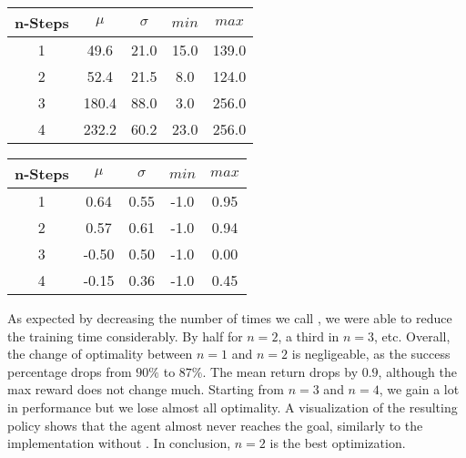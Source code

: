 \begin{table}[h!]
        \centering
        \begin{minipage}{.5\textwidth}
    \begin{tabular}[width=1\linewidth]{||c c c c c||} 
     \hline
     n-Steps & $\mu$ & $\sigma$ & $min$ & $max$ \\  [0.5ex] 
     \hline\hline
     1 & 49.6 & 21.0 & 15.0 & 139.0 \\ 
     \hline
     2 & 52.4 & 21.5 & 8.0 & 124.0 \\
     \hline
     3 & 180.4 & 88.0 & 3.0 & 256.0 \\
     \hline
     4 & 232.2 & 60.2 & 23.0 & 256.0 \\ [1ex] 
     \hline
    \end{tabular}
\end{minipage}%
\begin{minipage}{.5\textwidth}
    \centering
    \begin{tabular}[width=1\linewidth]{||c c c c c||} 
     \hline
     n-Steps & $\mu$ & $\sigma$ & $min$ & $max$ \\  [0.5ex] 
     \hline\hline
     1 & 0.64 & 0.55 & -1.0 & 0.95 \\ 
     \hline
     2 & 0.57 & 0.61 & -1.0 & 0.94 \\
     \hline
     3 & -0.50 & 0.50 & -1.0 & 0.00 \\
     \hline
     4 & -0.15 & 0.36 & -1.0 & 0.45 \\ [1ex] 
     \hline
    \end{tabular}
\end{minipage}%
\end{table}

As expected by decreasing the number of times we call \dio{}, we were able to reduce the 
training time considerably. By half for $n=2$, a third in $n=3$, etc. Overall, the change of optimality 
between $n=1$ and $n=2$ is negligeable, as the success percentage drops from $90\%$ to $87\%$. 
The mean return drops by $0.9$, although the max reward does not change much. 
Starting from $n=3$ and $n=4$, we gain a lot in performance but we lose almost all optimality. 
A visualization of the resulting policy shows that the agent almost never reaches the goal, similarly to the 
implementation without \dio{}. In conclusion, $n=2$ is the best optimization. 


